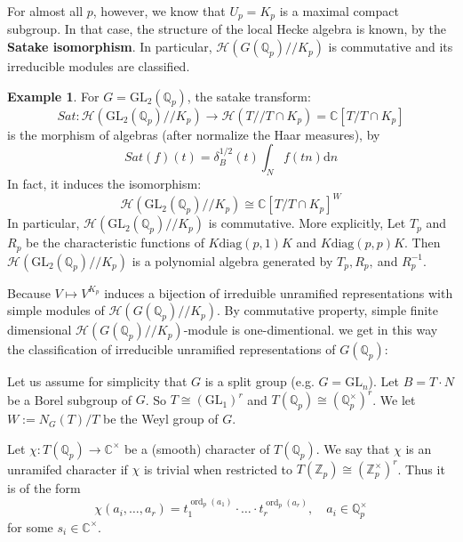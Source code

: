 \documentclass[11pt,english]{smfart}
\theoremstyle{definition}
\newtheorem{example}{Example}
\theoremstyle{remark}
\begin{document}
For almost all $ p $, however, we know that $ U_{p}=   K_{p} $ is a maximal compact subgroup.
In that case, the structure of the local Hecke algebra is known, by the \textbf{Satake isomorphism}.
In particular, $ \mathcal{H}\left(G\left(\mathbb{Q}_{p}\right) / / K_{p}\right) $ is commutative and its irreducible modules are classified.
\begin{example}
For $G=\mathrm{GL_2}(\mathbb{Q}_p)$, the satake transform:
\[Sat:\mathcal{H}\left(\mathrm{GL_2}\left(\mathbb{Q}_{p}\right) / / K_{p}\right)  \rightarrow \mathcal{H}(T//T \cap K_p)=\mathbb{C}[T/T \cap K_p]\]
is the morphism of algebras (after normalize the Haar measures), by
\[Sat(f)(t) =\delta_B^{1/2} (t) \int _N f(tn) \mathrm{d} n\]
In fact, it induces the isomorphism:
\[\mathcal{H}\left(\mathrm{GL_2}\left(\mathbb{Q}_{p}\right) / / K_{p}\right)  \cong \mathbb{C}[T/T \cap K_p]^{W}\]
In particular, $\mathcal{H}\left(\mathrm{GL_2}\left(\mathbb{Q}_{p}\right) / / K_{p}\right)$ is commutative.
More explicitly, Let $T_p$ and $R_p$ be the characteristic functions of $K\mathrm{diag} (p,1)K$ and $K\mathrm{diag} (p,p)K$.
Then $\mathcal{H}\left(\mathrm{GL_2}\left(\mathbb{Q}_{p}\right) / / K_{p}\right) $ is a polynomial algebra generated by $T_p,R_p,\ $and $R_p^{-1}$.
\end{example}
Because $ V \mapsto V^{K_{p}} $ induces a bijection of irreduible unramified representations with simple modules of $ \mathcal{H}\left(G\left(\mathbb{Q}_{p}\right) / / K_{p}\right) $. By commutative property, simple finite dimensional $ \mathcal{H}\left(G\left(\mathbb{Q}_{p}\right) / / K_{p}\right) $-module is one-dimentional.
we get in this way the classification of irreducible unramified representations of $ G\left(\mathbb{Q}_{p}\right) $:

Let us assume for simplicity that $ G $ is a split group (e.g. $ G=\mathrm{GL}_{n}  $). Let $ B=T \cdot N $ be a Borel subgroup of $ G $. So $ T \cong\left(\mathrm{GL}_{1}\right)^{r} $ and $ T\left(\mathbb{Q}_{p}\right) \cong\left(\mathbb{Q}_{p}^{\times}\right)^{r} $.
We let $ W:=N_{G}(T) / T $ be the Weyl group of $ G $.

Let $ \chi: T\left(\mathbb{Q}_{p}\right) \rightarrow \mathbb{C}^{\times}$ be a (smooth) character of $ T\left(\mathbb{Q}_{p}\right) $.
We say that $ \chi $ is an unramifed character if $ \chi $ is trivial when restricted to $T\left(\mathbb{Z}_{p}\right) \cong\left(\mathbb{Z}_{p}^{\times}\right)^{r} $.
Thus it is of the form
\[\chi\left(a_{i}, \ldots, a_{r}\right)=t_{1}^{\operatorname{ord}_{p}\left(a_{1}\right)} \cdot \ldots \cdot t_{r}^{\operatorname{ord}_{p}\left(a_{r}\right)}, \quad a_{i} \in \mathbb{Q}_{p}^{\times}\]
for some $ s_{i} \in \mathbb{C}^{\times} $.
\end{document}
